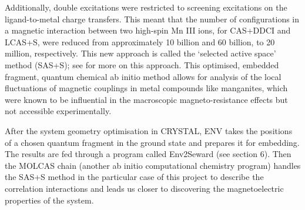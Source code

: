 \documentclass[10pt]{article}
\begin{document}
Additionally, double excitations were restricted to screening excitations on the ligand-to-metal charge transfers. This meant that the number of configurations in a magnetic interaction between two high-spin Mn III ions, for CAS+DDCI and LCAS+S, were reduced from approximately 10 billion and 60 billion, to 20 million, respectively. This new approach is called the `selected active space' method (SAS+S); see \cite{gelle2009accurate} for more on this approach. This optimised, embedded fragment, quantum chemical ab initio method allows for analysis of the local fluctuations of magnetic couplings in metal compounds like manganites, which were known to be influential in the macroscopic magneto-resistance effects but not accessible experimentally.

After the system geometry optimisation in CRYSTAL, ENV takes the positions of a chosen quantum fragment in the ground state and prepares it for embedding. The results are fed through a program called Env2Seward (see section 6). Then the MOLCAS chain (another ab initio computational chemistry program) handles the SAS+S method in the particular case of this project to describe the correlation interactions and leads us closer to discovering the magnetoelectric properties of the system.



\end{document}
